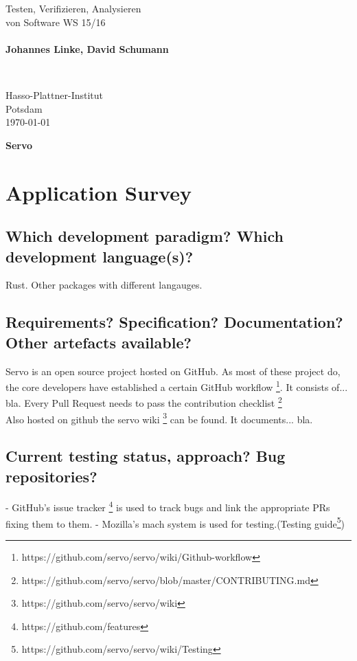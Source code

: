 \documentclass{scrartcl}
\begin{document}
\pagestyle{plain}


\noindent
\begin{minipage}{0.66\textwidth}
Testen, Verifizieren, Analysieren\\
von Software WS 15/16\\
~\\
\textbf{Johannes Linke, David Schumann}
\end{minipage}
~
\begin{minipage}{0.30\textwidth}
Hasso-Plattner-Institut\\
Potsdam\\
\today
\end{minipage}


\begin{center}
 \huge \bf Servo
\end{center}

\section{Application Survey}


\subsection*{Which development paradigm? Which development
language(s)?}
Rust. Other packages with different langauges.
\subsection*{Requirements? Specification? Documentation? Other artefacts available?}
Servo is an open source project hosted on GitHub. As most of these project do, the core developers have established a certain GitHub workflow \footnote{https://github.com/servo/servo/wiki/Github-workflow}. It consists of... bla. Every Pull Request needs to pass the contribution checklist \footnote{https://github.com/servo/servo/blob/master/CONTRIBUTING.md}\\

Also hosted on github the servo wiki \footnote{https://github.com/servo/servo/wiki} can be found. It documents... bla.

\subsection*{Current testing status, approach? Bug repositories?}
- GitHub's issue tracker \footnote{https://github.com/features} is used to track bugs and link the appropriate PRs fixing them to them.
- Mozilla's mach system is used for testing.(Testing guide\footnote{https://github.com/servo/servo/wiki/Testing})
\end{document}
